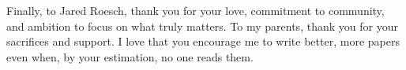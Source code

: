 Finally, to Jared Roesch, thank you for your love, commitment to community,
and ambition to focus on what truly matters. To my parents,
thank you for your sacrifices and support. I love that you
encourage me to write better, more papers even when, by your estimation,
no one reads them.
















